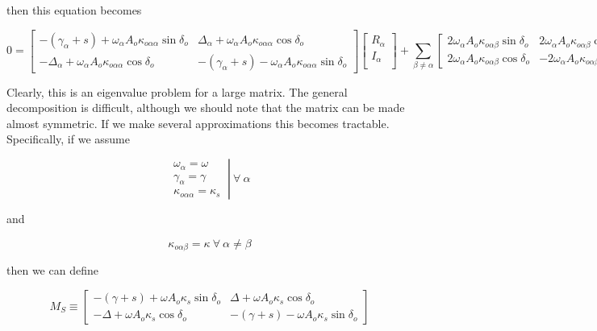 then this equation becomes

\begin{equation}
0
=
\begin{bmatrix}
-(\gamma_\alpha+s) + \omega_\alpha A_o \kappa_{o\alpha\alpha}\sin\delta_o & \Delta_\alpha + \omega_\alpha A_o \kappa_{o\alpha\alpha}\cos\delta_o \\
-\Delta_\alpha + \omega_\alpha A_o \kappa_{o\alpha\alpha}\cos\delta_o & -(\gamma_\alpha+s) - \omega_\alpha A_o \kappa_{o\alpha\alpha}\sin\delta_o 
\end{bmatrix}
\begin{bmatrix}
R_\alpha \\
I_\alpha \\
\end{bmatrix}
+ \sum_{\beta\neq\alpha} \begin{bmatrix}
2\omega_\alpha A_o \kappa_{o\alpha\beta}\sin\delta_o & 2\omega_\alpha A_o \kappa_{o\alpha\beta}\cos\delta_o \\
2\omega_\alpha A_o \kappa_{o\alpha\beta}\cos\delta_o & -2\omega_\alpha A_o \kappa_{o\alpha\beta}\sin\delta_o 
\end{bmatrix}
\end{equation}

Clearly, this is an eigenvalue problem for a large matrix. The general decomposition is difficult, although we should note that the matrix can be made almost symmetric. If we make several approximations this becomes tractable. Specifically, if we assume

\begin{equation}
\left.\begin{matrix}
\omega_\alpha = \omega \\ 
\gamma_\alpha = \gamma \\
\kappa_{o\alpha\alpha} = \kappa_s 
\end{matrix}\ \right|\ \forall\ \alpha
\end{equation}

and 

\begin{equation}
\kappa_{o\alpha\beta} = \kappa\ \forall\ \alpha\neq\beta
\end{equation}

then we can define

\begin{equation}
M_S \equiv 
\begin{bmatrix}
-(\gamma+s) + \omega A_o \kappa_s\sin\delta_o & \Delta + \omega A_o \kappa_s\cos\delta_o \\
-\Delta + \omega A_o \kappa_s\cos\delta_o & -(\gamma+s) - \omega A_o \kappa_s\sin\delta_o
\end{bmatrix}
\end{equation}

